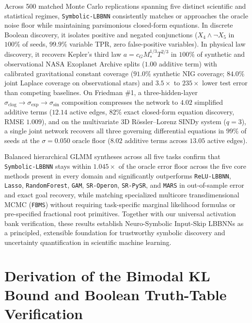 \documentclass[11pt,a4paper]{article}
\begin{document}
Across 500 matched Monte Carlo replications spanning five distinct scientific and statistical regimes, \texttt{Symbolic-LBBNN} consistently matches or approaches the oracle noise floor while maintaining parsimonious closed-form equations. In discrete Boolean discovery, it isolates positive and negated conjunctions ($X_4 \land \neg X_5$ in $100\%$ of seeds, $99.9\%$ variable TPR, zero false-positive variables). In physical law discovery, it recovers Kepler's third law $a = c_G M_*^{1/3} T^{2/3}$ in $100\%$ of synthetic and observational NASA Exoplanet Archive splits ($1.00$ additive term) with calibrated gravitational constant coverage ($91.0\%$ synthetic NIG coverage; $84.0\%$ joint Laplace coverage on observational stars) and $3.5\times$ to $235\times$ lower test error than competing baselines. On Friedman \#1, a three-hidden-layer $\sigma_{\text{clog}} \to \sigma_{\exp} \to \sigma_{\sin}$ composition compresses the network to $4.02$ simplified additive terms ($12.14$ active edges, $82\%$ exact closed-form equation discovery, RMSE $1.009$), and on the multivariate 3D R\"ossler--Lorenz SINDy system ($q = 3$), a single joint network recovers all three governing differential equations in $99\%$ of seeds at the $\sigma = 0.050$ oracle floor ($8.02$ additive terms across $13.05$ active edges).

Balanced hierarchical GLMM syntheses across all five tasks confirm that \texttt{Symbolic-LBBNN} stays within $1.045\times$ of the oracle error floor across the five core methods present in every domain and significantly outperforms \texttt{ReLU-LBBNN}, \texttt{Lasso}, \texttt{RandomForest}, \texttt{GAM}, \texttt{SR-Operon}, \texttt{SR-PySR}, and \texttt{MARS} in out-of-sample error and exact goal recovery, while matching specialized multicore transdimensional MCMC (\texttt{FBMS}) without requiring task-specific marginal likelihood formulas or pre-specified fractional root primitives. Together with our universal activation bank verification, these results establish Neuro-Symbolic Input-Skip LBBNNs as a principled, extensible foundation for trustworthy symbolic discovery and uncertainty quantification in scientific machine learning.

\clearpage
\appendix

\section{Derivation of the Bimodal KL Bound and Boolean Truth-Table Verification}
\label{app:kl_derivation}
\end{document}
